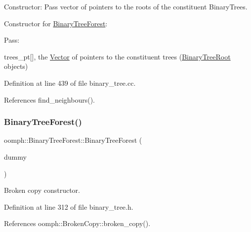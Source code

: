 Constructor\+: Pass vector of pointers to the roots of the constituent Binary\+Trees. 

Constructor for \hyperlink{classoomph_1_1BinaryTreeForest}{Binary\+Tree\+Forest}\+:

Pass\+:
\begin{DoxyItemize}
\item trees\+\_\+pt\mbox{[}\mbox{]}, the \hyperlink{classoomph_1_1Vector}{Vector} of pointers to the constituent trees (\hyperlink{classoomph_1_1BinaryTreeRoot}{Binary\+Tree\+Root} objects) 
\end{DoxyItemize}

Definition at line 439 of file binary\+\_\+tree.\+cc.



References find\+\_\+neighbours().

\mbox{\label{classoomph_1_1BinaryTreeForest_a15182098b581aa96b00a4f155c85cc8c}} 
\subsubsection{\texorpdfstring{Binary\+Tree\+Forest()}{BinaryTreeForest()}\hspace{0.1cm}{\footnotesize\ttfamily [3/3]}}
{\footnotesize\ttfamily oomph\+::\+Binary\+Tree\+Forest\+::\+Binary\+Tree\+Forest (\begin{DoxyParamCaption}\item[{const \hyperlink{classoomph_1_1BinaryTreeForest}{Binary\+Tree\+Forest} \&}]{dummy }\end{DoxyParamCaption})\hspace{0.3cm}{\ttfamily [inline]}}



Broken copy constructor. 



Definition at line 312 of file binary\+\_\+tree.\+h.



References oomph\+::\+Broken\+Copy\+::broken\+\_\+copy().

\mbox{\label{classoomph_1_1BinaryTreeForest_a6aa265e1c1c5b3be62b2f79d7c13c306}} 
